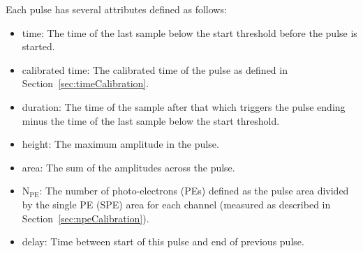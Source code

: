 \documentclass[12pt]{article}
\newcommand{\npe} {\mbox{\ensuremath{\textrm{N}_\textrm{PE}}\xspace}}
\begin{document}
Each pulse has several attributes defined as follows:

\begin{itemize}
    \item time: The time of the last sample below the start threshold before the pulse is started.
    \item calibrated time: The calibrated time of the pulse as defined in Section~\ref{sec:timeCalibration}.
    \item duration: The time of the sample after that which triggers the pulse ending minus the time of the last sample below the start threshold.
    \item height: The maximum amplitude in the pulse.
    \item area: The sum of the amplitudes across the pulse.
    \item \npe: The number of photo-electrons (PEs) defined as the pulse area divided by the single PE (SPE) area for each channel (measured as described in Section~\ref{sec:npeCalibration}).
    \item delay: Time between start of this pulse and end of previous pulse.
\end{itemize}
\end{document}
